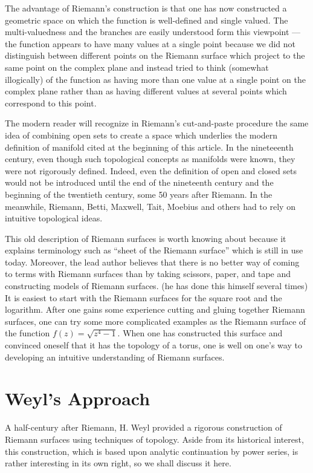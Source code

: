 \documentclass[12pt]{article}
\begin{document}
The advantage of Riemann's construction is that one has now constructed a geometric space on which the function is well-defined and single valued.  The multi-valuedness and the branches are easily understood form this viewpoint ---the function appears to have many values at a single point because we did not distinguish between different points on the Riemann surface which project to the same point on the complex plane and instead tried to think (somewhat illogically) of the function as having more than one value at a single point on the complex plane rather than as having different values at several points which correspond to this point.

The modern reader will recognize in Riemann's cut-and-paste procedure the same idea of combining open sets to create a space which underlies the modern definition of manifold cited at the beginning of this article.  In the nineteeenth century, even though such topological concepts as manifolds were known, they were not rigorously defined.  Indeed, even the definition of open and closed sets would not be introduced until the end of the nineteenth century and the beginning of the twentieth century, some 50 years after Riemann.  In the meanwhile, Riemann, Betti, Maxwell, Tait, Moebius and others had to rely on intuitive topological ideas.

This old description of Riemann surfaces is worth knowing about because it explains terminology such as ``sheet of the Riemann surface'' which is still in use today.  Moreover, the lead author believes that there is no better way of coming to terms with Riemann surfaces than by taking scissors, paper, and tape and constructing models of Riemann surfaces. (he has done this himself several times)  It is easiest to start with the Riemann surfaces for the square root and the logarithm.  After one gains some experience cutting and gluing together Riemann surfaces, one can try some more complicated examples as the Riemann surface of the function $f(z) = \sqrt{z^4 - 1}$.  When one has constructed this surface and convinced oneself that it has the topology of a torus, one is well on one's way to developing an intuitive understanding of Riemann surfaces.

\section{Weyl's Approach}

A half-century after Riemann, H. Weyl provided a rigorous construction of
Riemann surfaces using techniques of topology.  Aside from its historical
interest, this construction, which is based upon analytic continuation by
power series, is rather interesting in its own right, so we
shall discuss it here. 
\end{document}

